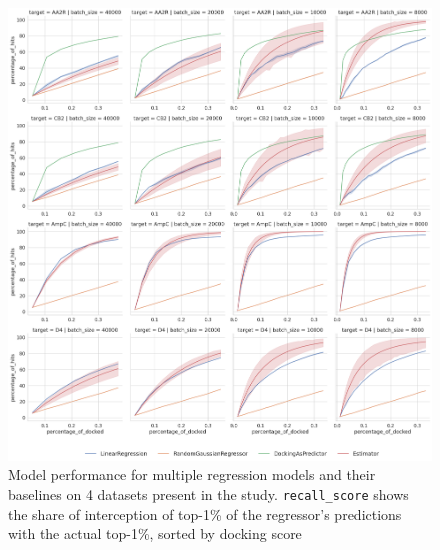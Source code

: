 \begin{figure}[ht]
\centering
\includegraphics[width=1.0\textwidth]{figures/figure_4_iterations.png}
\caption{Model performance for multiple regression models and their baselines on 4 datasets present in the study. \texttt{recall\_score} shows the share of interception of top-1\% of the regressor's predictions with the actual top-1\%, sorted by docking score}
\label{fig:fig_4_extrapolation}
\end{figure}

\begin{table}[!ht]
    \centering
    \begin{adjustbox}{angle=90}
        \resizebox{1.2\textwidth}{!}
        {
            
        }
    \end{adjustbox}
\end{table}

